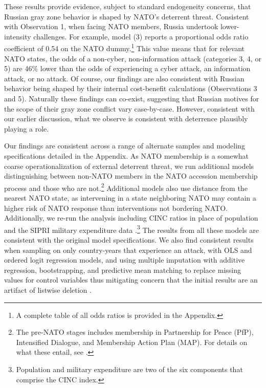 \documentclass[11pt,letterpaper,pdftex,dvipsnames,table]{article}
\begin{document}
These results provide evidence, subject to standard endogeneity concerns, that Russian gray zone behavior is shaped by  NATO's deterrent threat. Consistent with Observation 1, when facing NATO members, Russia undertook lower-intensity challenges. For example, model (3) reports a proportional odds ratio coefficient of 0.54 on the NATO dummy.\footnote{A complete table of all odds ratios is provided in the Appendix.} This value means that for relevant NATO states, the odds of a non-cyber, non-information attack (categories 3, 4, or 5) are 46\% lower than the odds of experiencing a cyber attack, an information attack, or no attack. Of course, our findings are also consistent with Russian behavior being shaped by their internal cost-benefit calculations (Observations 3 and 5). Naturally these findings can co-exist, suggesting that Russian motives for the scope of their gray zone conflict vary case-by-case. However, consistent with our earlier discussion, what we observe is consistent with deterrence plausibly playing a role.

Our findings are consistent across a range of alternate samples and modeling specifications detailed in the Appendix. As NATO membership is a somewhat coarse operationalization of external deterrent threat, we run additional models distinguishing between non-NATO members in the NATO accession membership process and those who are not.\footnote{The pre-NATO stages includes membership in Partnership for Peace (PfP), Intensified Dialogue, and Membership Action Plan (MAP). For details on what these entail, see \citet{amara_unfulfilledpromisesimpact_2010}.} Additional models also use distance from the nearest NATO state, as intervening in a state neighboring NATO may contain a higher risk of NATO response than interventions not bordering NATO. Additionally, we re-run the analysis including CINC ratios in place of population and the SIPRI military expenditure data \citep{singer_capabilitydistributionuncertainty_1972}.\footnote{Population and military expenditure are two of the six components that comprise the CINC index.} The results from all these models are consistent with the original model specifications. We also find consistent results when sampling on only country-years that experience an attack, with OLS and ordered logit regression models, and using multiple imputation with additive regression, bootstrapping, and predictive mean matching to replace missing values for control variables thus mitigating concern that the initial results are an artifact of listwise deletion \citep{buuren_flexibleimputationmissing_2012, arel-bundock_whencanmultiple_2018}.
\end{document}

